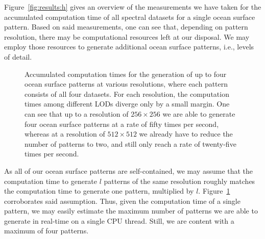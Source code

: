 %
%
Figure~\ref{fig:results:h} gives an overview of the measurements we have taken
for the accumulated computation time of all spectral datasets for a single
ocean surface pattern. Based on said measurements, one can see that, depending
on pattern resolution, there may be computational resources left at our
disposal.
We may employ those resources to generate additional ocean surface patterns,
i.e., levels of detail.
%
\begin{figure}
\centering
\mydata
{}
\caption{Accumulated computation times for the generation of up to four
ocean surface patterns at various resolutions, where each pattern consists of
all four datasets.
For each resolution, the computation times among different LODs diverge only
by a small margin.
One can see that up to a resolution of $256 \times 256$ we are able to generate
four ocean surface patterns at a rate of fifty times per second, whereas at a
resolution of $512 \times 512$ we already have to reduce the number of patterns
to two, and still only reach a rate of twenty-five times per second.}
\label{fig:results:lods}
\end{figure}
%
As all of our ocean surface patterns are self-contained, we may assume
that the computation time to generate $l$ patterns of the same resolution
roughly matches the computation time to generate one pattern, multiplied by
$l$. Figure~\ref{fig:results:lods} corroborates said assumption.
Thus, given the computation time of a single pattern, we may easily estimate
the maximum number of patterns we are able to generate in real-time on a
single CPU thread. Still, we are content with a maximum of four patterns.

